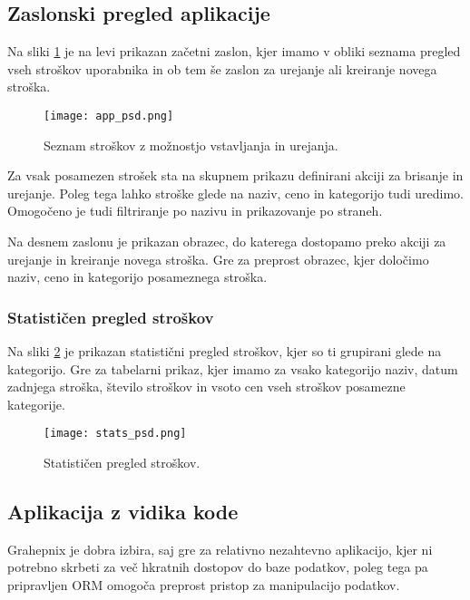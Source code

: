 \documentclass[a4paper,12pt,openright]{book}
\begin{document}
    \subsection{Zaslonski pregled aplikacije}
    Na sliki \ref{home_screen} je na levi prikazan začetni zaslon, kjer imamo v obliki seznama pregled vseh stroškov uporabnika in ob tem še zaslon za urejanje ali kreiranje novega stroška. 
    
    \begin{figure}[H]
        \centerline{\texttt{[image: app\_psd.png]}}
        \caption{Seznam stroškov z možnostjo vstavljanja in urejanja.}
        \label{home_screen}
    \end{figure}

    \noindent
    Za vsak posamezen strošek sta na skupnem prikazu definirani akciji za brisanje in urejanje. Poleg tega lahko stroške glede na naziv, ceno in kategorijo tudi uredimo. Omogočeno je tudi filtriranje po nazivu in prikazovanje po straneh.

    Na desnem zaslonu je prikazan obrazec, do katerega dostopamo preko akciji za urejanje in kreiranje novega stroška. Gre za preprost obrazec, kjer določimo naziv, ceno in kategorijo posameznega stroška.

    \subsubsection{Statističen pregled stroškov}
    Na sliki \ref{stats_screen} je prikazan statistični pregled stroškov, kjer so ti grupirani glede na kategorijo. Gre za tabelarni prikaz, kjer imamo za vsako kategorijo naziv, datum zadnjega stroška, število stroškov in vsoto cen vseh stroškov posamezne kategorije.

    \begin{figure}[H]
        \centerline{\texttt{[image: stats\_psd.png]}}
        \caption{Statističen pregled stroškov.}
        \label{stats_screen}
    \end{figure}

    \subsection{Aplikacija z vidika kode}

    Grahepnix je dobra izbira, saj gre za relativno nezahtevno aplikacijo, kjer ni potrebno skrbeti za več hkratnih dostopov do baze podatkov, poleg tega pa pripravljen ORM omogoča preprost pristop za manipulacijo podatkov.
\end{document}
